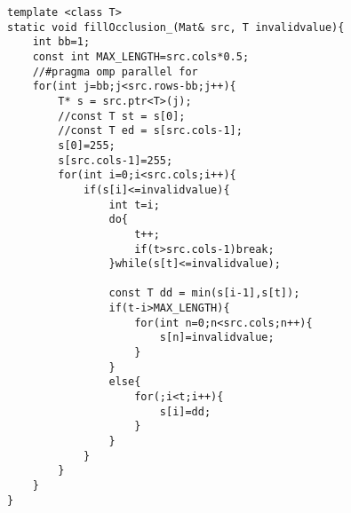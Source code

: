 \begin{lstlisting}[basicstyle=\tiny]
template <class T>
static void fillOcclusion_(Mat& src, T invalidvalue){
    int bb=1;
    const int MAX_LENGTH=src.cols*0.5;
    //#pragma omp parallel for
    for(int j=bb;j<src.rows-bb;j++){
        T* s = src.ptr<T>(j);
        //const T st = s[0];
        //const T ed = s[src.cols-1];
        s[0]=255;
        s[src.cols-1]=255;
        for(int i=0;i<src.cols;i++){
            if(s[i]<=invalidvalue){
                int t=i;
                do{
                    t++;
                    if(t>src.cols-1)break;
                }while(s[t]<=invalidvalue);

                const T dd = min(s[i-1],s[t]);
                if(t-i>MAX_LENGTH){
                    for(int n=0;n<src.cols;n++){
                        s[n]=invalidvalue;
                    }
                }
                else{
                    for(;i<t;i++){
                        s[i]=dd;
                    }
                }
            }
        }
    }
}
\end{lstlisting}

